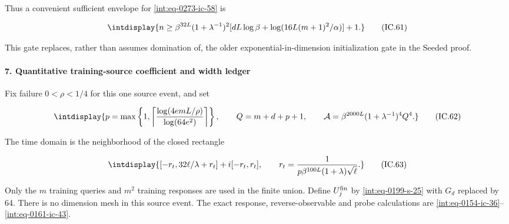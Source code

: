 Thus a convenient sufficient envelope for \eqref{int:eq-0273-ic-58} is


\begingroup\renewcommand{\theHequation}{intdisplay.655}
\begin{equation}
\intdisplay{
n\ge\beta^{32L}(1+\lambda^{-1})^2
 [dL\log\beta+\log(16L(m+1)^2/\alpha)]+1.
}
\tag{IC.61}
\label{int:eq-0276-ic-61}
\end{equation}
\endgroup


This gate replaces, rather than assumes domination of, the older exponential-in-dimension initialization gate in the Seeded proof.


\paragraph{7. Quantitative training-source coefficient and width ledger}
\label{int:source-quantitative-ledger}

\mbox{}\par\smallskip


Fix failure \(0<\rho<1/4\) for this one source event, and set


\begingroup\renewcommand{\theHequation}{intdisplay.656}
\begin{equation}
\intdisplay{
p=\max\left\{1,\left\lceil\frac{\log(4emL/\rho)}{\log(64e^2)}
                         \right\rceil\right\},\qquad
 Q=m+d+p+1,\qquad
 \mathcal A=\beta^{2000L}(1+\lambda^{-1})^4Q^4.
}
\tag{IC.62}
\label{int:eq-0277-ic-62}
\end{equation}
\endgroup


The time domain is the neighborhood of the closed rectangle


\begingroup\renewcommand{\theHequation}{intdisplay.657}
\begin{equation}
\intdisplay{
[-r_t,32\ell/\lambda+r_t]+i[-r_t,r_t],\qquad
 r_t=\frac{1}{p\beta^{100L}(1+\lambda)\sqrt\ell}.
}
\tag{IC.63}
\label{int:eq-0278-ic-63}
\end{equation}
\endgroup


Only the \(m\) training queries and \(m^2\) training responses are used in the finite union. Define \(U_j^{\rm fin}\) by \eqref{int:eq-0199-s-25} with \(G_d\) replaced by 64. There is no dimension mesh in this source event. The exact response, reverse-observable and probe calculations are \eqref{int:eq-0154-ic-36}--\allowbreak \eqref{int:eq-0161-ic-43}.


